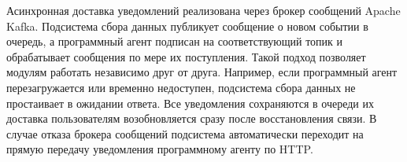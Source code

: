 Асинхронная доставка уведомлений реализована через брокер сообщений Apache Kafka. Подсистема сбора данных публикует сообщение о новом событии в очередь, а программный агент подписан на соответствующий топик и обрабатывает сообщения по мере их поступления. 
Такой подход позволяет модулям работать независимо друг от друга. 
Например, если программный агент перезагружается или временно недоступен, подсистема сбора данных не простаивает в ожидании ответа. 
Все уведомления сохраняются в очереди их доставка пользователям возобновляется сразу после восстановления связи.
В случае отказа брокера сообщений подсистема автоматически переходит на прямую передачу уведомления программному агенту по HTTP.
